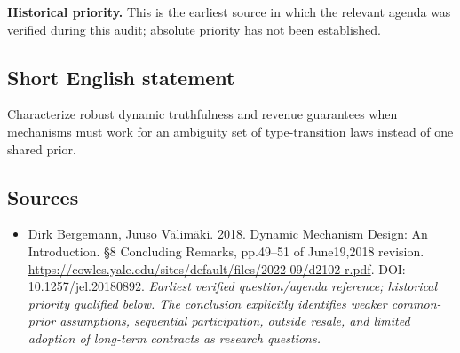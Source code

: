 \documentclass[11pt]{article}
\begin{document}
\par\textbf{Historical priority.} This is the earliest source in which the relevant agenda was verified during this audit; absolute priority has not been established.

\subsection{Short English statement}
Characterize robust dynamic truthfulness and revenue guarantees when mechanisms must work for an ambiguity set of type-transition laws instead of one shared prior.

\subsection{Sources}
\begin{itemize}\raggedright
\item[\textnormal{[S1]}]\hypertarget{source:30007572:1}{} Dirk Bergemann, Juuso Välimäki. 2018. Dynamic Mechanism Design: An Introduction. §8 Concluding Remarks, pp.49–51 of June19,2018 revision.
\url{https://cowles.yale.edu/sites/default/files/2022-09/d2102-r.pdf}.
DOI: 10.1257/jel.20180892.
{\small\textit{Earliest verified question/agenda reference; historical priority qualified below. The conclusion explicitly identifies weaker common-prior assumptions, sequential participation, outside resale, and limited adoption of long-term contracts as research questions.}}
\end{itemize}
\end{document}
